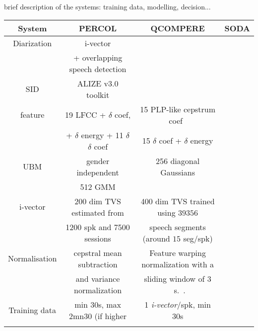 brief description of the systems: training data, modelling, decision...

\begin{table*}[t]
  \centering
  \begin{tabular}{|c|c|c|c|}
    \hline
    System          & PERCOL                                        & QCOMPERE                                        & SODA      \\
    \hline    
    Diarization     & i-vector \cite{charlet2013}                   &                                                 &           \\
                    & + overlapping speech detection                &                                                 &           \\
    \hline    
    SID             & ALIZE v3.0 toolkit \cite{larcher2013}         &                                                 &           \\
    \hline    
    feature         & 19 LFCC + $\delta$ coef,                      & 15 PLP-like cepstrum coef~\cite{Hermansky1990}  &           \\
                    & + $\delta$ energy + 11 $\delta$$\delta$ coef  & 15 $\delta$ coef + $\delta$ energy              &           \\
    \hline    
    UBM             & gender independent                            & 256 diagonal Gaussians                          &           \\
                    & 512 GMM                                       &                                                 &           \\
    \hline    
    i-vector        & 200 dim TVS estimated from                    & 400 dim TVS trained using $39356$               &           \\
                    & 1200 spk and 7500 sessions                    & speech segments (around $15$ seg/spk)           &           \\
    \hline    
    Normalisation   & cepstral mean subtraction                     & Feature warping normalization with a            &           \\
                    & and variance normalization                    & sliding window of $3$~s.~\cite{Pelecanos2001}.  &           \\
    \hline    
    Training data   & min 30s, max 2mn30 (if higher                 & 1 \emph{i-vector}/spk, min 30s                  &           \\
$$
\end{tabular}
\end{table*}
